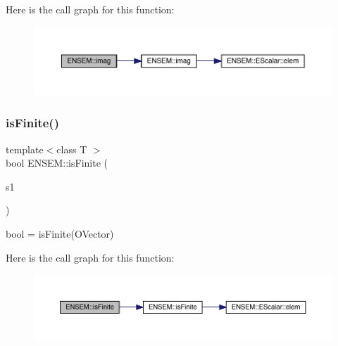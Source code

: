 Here is the call graph for this function\+:\nopagebreak
\begin{figure}[H]
\begin{center}
\leavevmode
\includegraphics[width=350pt]{da/d59/group__obsvector_gaf1cbe27c6155721a04405dcecb528d53_cgraph}
\end{center}
\end{figure}
\mbox{\label{group__obsvector_ga4955ee051f997aca2666a9361dcb7861}} 
\subsubsection{\texorpdfstring{isFinite()}{isFinite()}}
{\footnotesize\ttfamily template$<$class T $>$ \\
bool E\+N\+S\+E\+M\+::is\+Finite (\begin{DoxyParamCaption}\item[{const \mbox{\hyperlink{classENSEM_1_1OVector}{O\+Vector}}$<$ T $>$ \&}]{s1 }\end{DoxyParamCaption})}



bool = is\+Finite(\+O\+Vector) 

Here is the call graph for this function\+:\nopagebreak
\begin{figure}[H]
\begin{center}
\leavevmode
\includegraphics[width=350pt]{da/d59/group__obsvector_ga4955ee051f997aca2666a9361dcb7861_cgraph}
\end{center}
\end{figure}
\mbox{\label{group__obsvector_ga4faba5244cb224511d1944e1cc99b2db}} 
